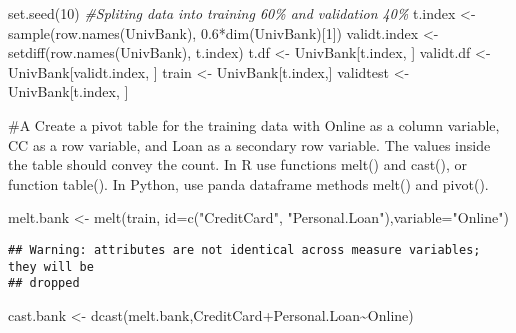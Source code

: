 \documentclass[
]{article}
\newenvironment{Shaded}{\begin{snugshade}}{\end{snugshade}}
\newcommand{\AttributeTok}[1]{\textcolor[rgb]{0.77,0.63,0.00}{#1}}
\newcommand{\CommentTok}[1]{\textcolor[rgb]{0.56,0.35,0.01}{\textit{#1}}}
\newcommand{\DecValTok}[1]{\textcolor[rgb]{0.00,0.00,0.81}{#1}}
\newcommand{\FloatTok}[1]{\textcolor[rgb]{0.00,0.00,0.81}{#1}}
\newcommand{\FunctionTok}[1]{\textcolor[rgb]{0.00,0.00,0.00}{#1}}
\newcommand{\NormalTok}[1]{#1}
\newcommand{\OtherTok}[1]{\textcolor[rgb]{0.56,0.35,0.01}{#1}}
\newcommand{\SpecialCharTok}[1]{\textcolor[rgb]{0.00,0.00,0.00}{#1}}
\newcommand{\StringTok}[1]{\textcolor[rgb]{0.31,0.60,0.02}{#1}}
\begin{document}
\begin{Shaded}
\begin{Highlighting}[]
\FunctionTok{set.seed}\NormalTok{(}\DecValTok{10}\NormalTok{)}
\CommentTok{\#Spliting data into training 60\% and validation 40\%}
\NormalTok{t.index }\OtherTok{\textless{}{-}}\FunctionTok{sample}\NormalTok{(}\FunctionTok{row.names}\NormalTok{(UnivBank), }\FloatTok{0.6}\SpecialCharTok{*}\FunctionTok{dim}\NormalTok{(UnivBank)[}\DecValTok{1}\NormalTok{])}
\NormalTok{validt.index }\OtherTok{\textless{}{-}} \FunctionTok{setdiff}\NormalTok{(}\FunctionTok{row.names}\NormalTok{(UnivBank), t.index)}
\NormalTok{t.df }\OtherTok{\textless{}{-}}\NormalTok{ UnivBank[t.index, ]}
\NormalTok{validt.df }\OtherTok{\textless{}{-}}\NormalTok{ UnivBank[validt.index, ]}
\NormalTok{train }\OtherTok{\textless{}{-}}\NormalTok{ UnivBank[t.index,]}
\NormalTok{validtest }\OtherTok{\textless{}{-}}\NormalTok{ UnivBank[t.index, ]}
\end{Highlighting}
\end{Shaded}

\#A Create a pivot table for the training data with Online as a column
variable, CC as a row variable, and Loan as a secondary row variable.
The values inside the table should convey the count. In R use functions
melt() and cast(), or function table(). In Python, use panda dataframe
methods melt() and pivot().

\begin{Shaded}
\begin{Highlighting}[]
\NormalTok{melt.bank }\OtherTok{\textless{}{-}} \FunctionTok{melt}\NormalTok{(train, }\AttributeTok{id=}\FunctionTok{c}\NormalTok{(}\StringTok{"CreditCard"}\NormalTok{, }\StringTok{"Personal.Loan"}\NormalTok{),}\AttributeTok{variable=}\StringTok{"Online"}\NormalTok{)}
\end{Highlighting}
\end{Shaded}

\begin{verbatim}
## Warning: attributes are not identical across measure variables; they will be
## dropped
\end{verbatim}

\begin{Shaded}
\begin{Highlighting}[]
\NormalTok{cast.bank }\OtherTok{\textless{}{-}} \FunctionTok{dcast}\NormalTok{(melt.bank,CreditCard}\SpecialCharTok{+}\NormalTok{Personal.Loan}\SpecialCharTok{\textasciitilde{}}\NormalTok{Online)}
\end{Highlighting}
\end{Shaded}
\end{document}
